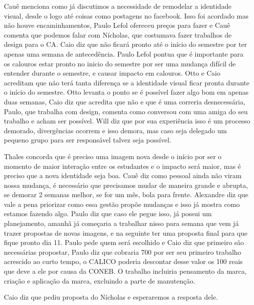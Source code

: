 \documentclass{ata-calico}
\begin{document}
\maketitle

Cauê menciona como já discutimos a necessidade de remodelar a identidade visual, desde o logo até coisas como postagens no facebook. Isso foi acordado mas não houve encaminhamentos, Paulo Lefol ofereceu preços para fazer e Cauê comenta que podemos falar com Nícholas, que costumava fazer trabalhos de design para o CA. Caio diz que não ficará pronto até o início do semestre por ter apenas uma semana de antecedência. Paulo Lefol pontua que é importante para os calouros estar pronto no inicio do semestre por ser uma mudança difícil de entender durante o semestre, e causar impacto em calouros. Otto e Caio acreditam que não terá tanta diferença se a identidade visual ficar pronta durante o início do semestre. Otto levanta o ponto se é possível fazer algo bom em apenas duas semanas, Caio diz que acredita que não e que é uma correria desnecessária, Paulo, que trabalha com design, comenta como conversou com uma amiga do seu trabalho e acham ser possível. Will diz que por sua experiência isso é um processo demorado, divergências ocorrem e isso demora, mas caso seja delegado um pequeno grupo para ser responsável talvez seja possível.

Thales concorda que é preciso uma imagem nova desde o início por ser o momento de maior interação entre os estudantes e o impacto será maior, mas é preciso que a nova identidade seja boa. Cauê diz como pessoal ainda não viram nossa mudança, é necessário que precisamos mudar de maneira grande e abrupta, se demorar 2 semanas melhor, se for um mês, bola para frente. Alexandre diz que vale a pena priorizar como essa gestão propõe mudanças e isso já mostra como estamos fazendo algo. Paulo diz que caso ele pegue isso, já possui um planejamento, amanhã já começaria a trabalhar nisso para semana que vem já trazer propostas de novas imagens, e na seguinte ter uma proposta final para que fique pronto dia 11. Paulo pede quem será escolhido e Caio diz que primeiro são necessárias propostar, Paulo diz que cobraria 700 por ser seu primeiro trabalho acrescido ao curto tempo, o CALICO poderia descontar desse valor os 100 reais que deve a ele por causa da CONEB. O trabalho incluiria pensamento da marca, criação e aplicação da marca, excluindo a parte de manutenção.

Caio diz que pediu proposta do Nícholas e esperaremos a resposta dele. 
\end{document}
